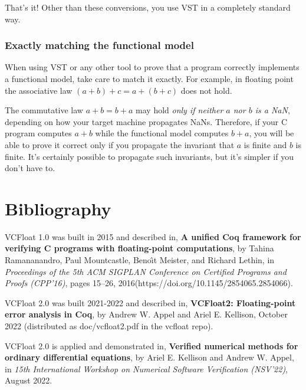 \documentclass[article]{memoir}
\begin{document}
That's it!  Other than these conversions, you use VST in
a completely standard way.  

\subsection*{Exactly matching the functional model}

When using VST or any other tool to prove that a program correctly
implements a functional model, take care to
match it exactly.  For example, in floating point the
associative law $(a+b)+c=a+(b+c)$ does not hold.

The commutative law $a+b=b+a$ may hold \emph{only if
neither $a$ nor $b$ is a NaN}, depending on how your target
machine propagates NaNs.  Therefore, if your C program
computes $a+b$ while the functional model computes $b+a$,
you will be able to prove it correct only if you propagate
the invariant that $a$ is finite and $b$ is finite.
It's certainly possible to propagate such invariants, but
it's simpler if you don't have to.

\chapter{Bibliography}

\quad VCFloat 1.0 was built in 2015 and described in,\newline
\textbf{A unified Coq framework for verifying C programs with floating-point computations}, by Tahina Ramananandro, Paul Mountcastle, Beno\^{\i}t  Meister, and Richard Lethin, in \emph{Proceedings of the 5th ACM SIGPLAN Conference on Certified Programs and Proofs (CPP'16)}, pages 15--26, 2016\newline (https://doi.org/10.1145/2854065.2854066).
\vspace\baselineskip

VCFloat 2.0 was built 2021-2022 and described in,\newline
\textbf{VCFloat2: Floating-point error analysis in Coq},
by Andrew W. Appel and Ariel E. Kellison,
October 2022  (distributed as doc/vcfloat2.pdf in the vcfloat repo).
\vspace\baselineskip

VCFloat 2.0 is applied and demonstrated in,\newline
\textbf{Verified numerical methods for ordinary differential equations},
by Ariel E. Kellison and Andrew W. Appel,
in \emph{15th International Workshop on Numerical Software Verification (NSV'22)}, August 2022.
\end{document}
